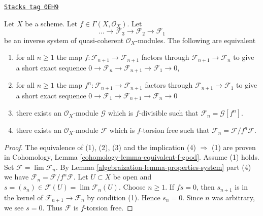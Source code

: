 \begin{lemma}
\label{algebraization-lemma-equivalent-f-good}
\href{https://stacks.math.columbia.edu/tag/0EH9}{\texttt{Stacks tag 0EH9}}

Let $X$ be a scheme. Let $f \in \Gamma(X, \mathcal{O}_X)$. Let
$$
\ldots \to \mathcal{F}_3 \to \mathcal{F}_2 \to \mathcal{F}_1
$$
be an inverse system of quasi-coherent $\mathcal{O}_X$-modules.
The following are equivalent
\begin{enumerate}
\item for all $n \geq 1$ the map
$f : \mathcal{F}_{n + 1} \to \mathcal{F}_{n + 1}$ factors
through $\mathcal{F}_{n + 1} \to \mathcal{F}_n$ to give a
short exact sequence
$0 \to \mathcal{F}_n \to \mathcal{F}_{n + 1} \to \mathcal{F}_1 \to 0$,
\item for all $n \geq 1$ the map
$f^n : \mathcal{F}_{n + 1} \to \mathcal{F}_{n + 1}$
factors through $\mathcal{F}_{n + 1} \to \mathcal{F}_1$
to give a short exact sequence
$0 \to \mathcal{F}_1 \to \mathcal{F}_{n + 1} \to \mathcal{F}_n \to 0$
\item there exists an $\mathcal{O}_X$-module $\mathcal{G}$
which is $f$-divisible such that $\mathcal{F}_n = \mathcal{G}[f^n]$.
\item there exists an $\mathcal{O}_X$-module $\mathcal{F}$ which is
$f$-torsion free such that $\mathcal{F}_n = \mathcal{F}/f^n\mathcal{F}$.
\end{enumerate}
\end{lemma}

\begin{proof}

The equivalence of (1), (2), (3) and the implication (4) $\Rightarrow$ (1)
are proven in Cohomology, Lemma \ref{cohomology-lemma-equivalent-f-good}.
Assume (1) holds. Set
$\mathcal{F} = \lim \mathcal{F}_n$. By Lemma \ref{algebraization-lemma-properties-system}
part (4) we have $\mathcal{F}_n = \mathcal{F}/f^n\mathcal{F}$.
Let $U \subset X$ be open and
$s = (s_n) \in \mathcal{F}(U) = \lim \mathcal{F}_n(U)$.
Choose $n \geq 1$. If $fs = 0$, then $s_{n + 1}$ is in the kernel of
$\mathcal{F}_{n + 1} \to \mathcal{F}_n$ by condition (1).
Hence $s_n = 0$. Since $n$ was arbitrary, we see $s = 0$.
Thus $\mathcal{F}$ is $f$-torsion free.
\end{proof}

